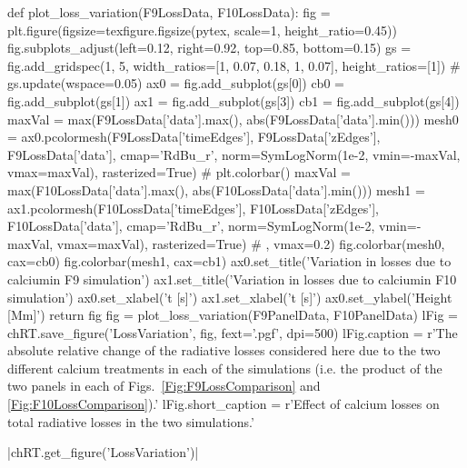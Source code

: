 \begin{pycode}[TimeDepRT]
def plot_loss_variation(F9LossData, F10LossData):
    fig = plt.figure(figsize=texfigure.figsize(pytex, scale=1, height_ratio=0.45))
    fig.subplots_adjust(left=0.12, right=0.92, top=0.85, bottom=0.15)
    gs = fig.add_gridspec(1, 5, width_ratios=[1, 0.07, 0.18, 1, 0.07], height_ratios=[1])
    # gs.update(wspace=0.05)
    ax0 = fig.add_subplot(gs[0])
    cb0 = fig.add_subplot(gs[1])
    ax1 = fig.add_subplot(gs[3])
    cb1 = fig.add_subplot(gs[4])
    maxVal = max(F9LossData['data'].max(), abs(F9LossData['data'].min()))
    mesh0 = ax0.pcolormesh(F9LossData['timeEdges'], F9LossData['zEdges'],
                        F9LossData['data'], cmap='RdBu_r', norm=SymLogNorm(1e-2, vmin=-maxVal, vmax=maxVal), rasterized=True)
    # plt.colorbar()
    maxVal = max(F10LossData['data'].max(), abs(F10LossData['data'].min()))
    mesh1 = ax1.pcolormesh(F10LossData['timeEdges'], F10LossData['zEdges'], F10LossData['data'],
                        cmap='RdBu_r', norm=SymLogNorm(1e-2, vmin=-maxVal, vmax=maxVal),
                        rasterized=True)
    #                        , vmax=0.2)
    fig.colorbar(mesh0, cax=cb0)
    fig.colorbar(mesh1, cax=cb1)
    ax0.set_title('Variation in losses due to calcium\ntreatment in F9 simulation')
    ax1.set_title('Variation in losses due to calcium\ntreatment in F10 simulation')
    ax0.set_xlabel('t [s]')
    ax1.set_xlabel('t [s]')
    ax0.set_ylabel('Height [Mm]')
    return fig
fig = plot_loss_variation(F9PanelData, F10PanelData)
lFig = chRT.save_figure('LossVariation', fig, fext='.pgf', dpi=500)
lFig.caption = r'The absolute relative change of the radiative losses considered here due to the two different calcium treatments in each of the simulations (i.e. the product of the two panels in each of Figs.~\ref{Fig:F9LossComparison} and \ref{Fig:F10LossComparison}).'
lFig.short_caption = r'Effect of calcium losses on total radiative losses in the two simulations.'
\end{pycode}
\py[TimeDepRT]|chRT.get_figure('LossVariation')|

